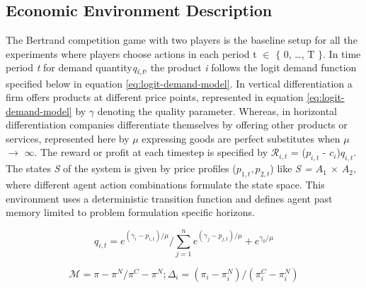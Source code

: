 \documentclass{article}
\begin{document}



\subsection{Economic Environment Description}


The  Bertrand competition game with two players is the baseline setup for all the experiments where players choose actions in each period t $\in$ $\{$ 0, …, T $\}$.
In time period \textit{t} for demand quantity\textit{q\textsubscript{i,t}}, the product \textit{i} follows the logit demand function specified below in equation \ref{eq:logit-demand-model}.
In vertical differentiation a firm offers products at different price points, represented in equation \ref{eq:logit-demand-model} by $\gamma$ denoting the quality parameter.
Whereas, in horizontal differentiation companies differentiate themselves by offering other products or services, represented here by $\mu$ expressing goods are perfect substitutes when $\mu$ $\rightarrow$ $\infty$.
The reward or profit at each timestep is specified by $\mathcal{R}_{i,t}$ = ($p_{i,t}$ - $c_{i}$)$q_{i,t}$.
The states \textit{S} of the system is given by price profiles (\textit{$p_{1,t},  p_{2,t}$}) like \textit{S = $A_1$ $\times$ $A_2$}, where different agent action combinations formulate the state space.
This environment uses a deterministic transition function and defines agent past memory limited to problem formulation specific horizons.


\begin{equation} \label{eq:logit-demand-model}
q_{i,t} = e^{ (\gamma_{i} - p_{i,t}) / \mu} /  \sum_{j=1}^{n} e^{(\gamma_{j} - p_{j,t}) / \mu}  + e^{\gamma_{0}/ \mu}
\end{equation} 


\begin{equation} \label{eq:collusion-index}
\mathcal{M} = \pi - \pi^{N} / \pi^{C} - \pi^{N};
\Delta_{i} = ( \pi_{i} - \pi_{i}^{N} ) / ( \pi_{i}^{C} - \pi_{i}^{N} )
\end{equation}
\end{document}

